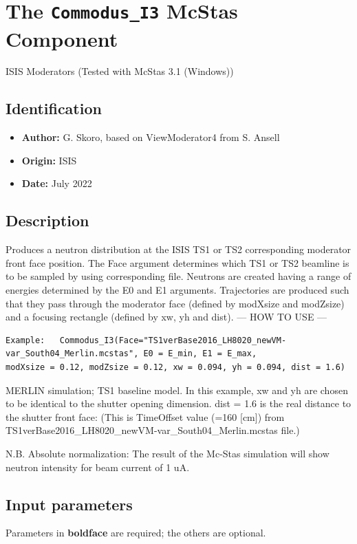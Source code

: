 \section{The \texttt{Commodus\_I3} McStas Component}
ISIS Moderators (Tested with McStas 3.1 (Windows))

\subsection*{Identification}
\begin{itemize}
  \item \textbf{Author:} G. Skoro, based on ViewModerator4 from S. Ansell
  \item \textbf{Origin:} ISIS
  \item \textbf{Date:} July 2022
\end{itemize}

\subsection*{Description}
Produces a neutron distribution at the ISIS TS1 or TS2 corresponding moderator front face position. The Face argument determines which TS1 or TS2 beamline is to be sampled by using corresponding file. Neutrons are created having a range of energies determined by the E0 and E1 arguments. Trajectories are produced such that they pass through the moderator face (defined by modXsize and modZsize) and a focusing rectangle (defined by xw, yh and dist). --- HOW TO USE ---

\begin{verbatim}
Example:   Commodus_I3(Face="TS1verBase2016_LH8020_newVM-var_South04_Merlin.mcstas", E0 = E_min, E1 = E_max,
modXsize = 0.12, modZsize = 0.12, xw = 0.094, yh = 0.094, dist = 1.6)
\end{verbatim}

MERLIN simulation; TS1 baseline model. In this example, xw and yh are chosen to be identical to the shutter opening dimension. dist = 1.6 is the real distance to the shutter front face: (This is TimeOffset value (=160 [cm]) from TS1verBase2016\_LH8020\_newVM-var\_South04\_Merlin.mcstas file.)

N.B. Absolute normalization: The result of the Mc-Stas simulation will show neutron intensity for beam current of 1 uA.

\subsection*{Input parameters}
Parameters in \textbf{boldface} are required; the others are optional.

